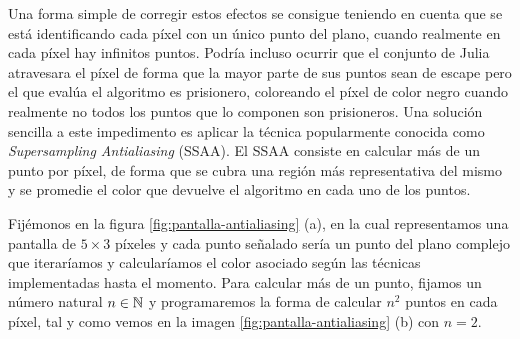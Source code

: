 Una forma simple de corregir estos efectos se consigue teniendo en cuenta que se está identificando cada píxel con un único punto del plano, cuando realmente en cada píxel hay infinitos puntos. Podría incluso ocurrir que el conjunto de Julia atravesara el píxel de forma que la mayor parte de sus puntos sean de escape pero el que evalúa el algoritmo es prisionero, coloreando el píxel de color negro cuando realmente no todos los puntos que lo componen son prisioneros. Una solución sencilla a este impedimento es aplicar la técnica popularmente conocida como \textit{Supersampling Antialiasing} (SSAA). El SSAA consiste en calcular más de un punto por píxel, de forma que se cubra una región más representativa del mismo y se promedie el color que devuelve el algoritmo en cada uno de los puntos.

Fijémonos en la figura \ref{fig:pantalla-antialiasing} (a), en la cual representamos una pantalla de $5\times 3$ píxeles y cada punto señalado sería un punto del plano complejo que iteraríamos y calcularíamos el color asociado según las técnicas implementadas hasta el momento. Para calcular más de un punto, fijamos un número natural $n\in\mathbb{N}$ y programaremos la forma de calcular $n^2$ puntos en cada píxel, tal y como vemos en la imagen \ref{fig:pantalla-antialiasing} (b) con $n=2$.

